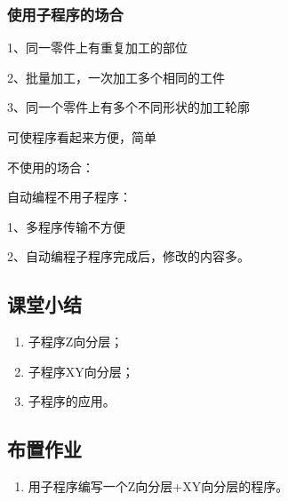 \subsubsection{使用子程序的场合}
1、同一零件上有重复加工的部位

2、批量加工，一次加工多个相同的工件

3、同一个零件上有多个不同形状的加工轮廓

可使程序看起来方便，简单

不使用的场合：

自动编程不用子程序：

1、多程序传输不方便

2、自动编程子程序完成后，修改的内容多。

\subsection{课堂小结}
\begin{enumerate}[1、]
	\item 子程序Z向分层；
	\item 子程序XY向分层；
	\item 子程序的应用。	
\end{enumerate}

\vfill
\subsection{布置作业}
\begin{enumerate}[1、]
	\item 用子程序编写一个Z向分层+XY向分层的程序。 
\end{enumerate}
\vfill